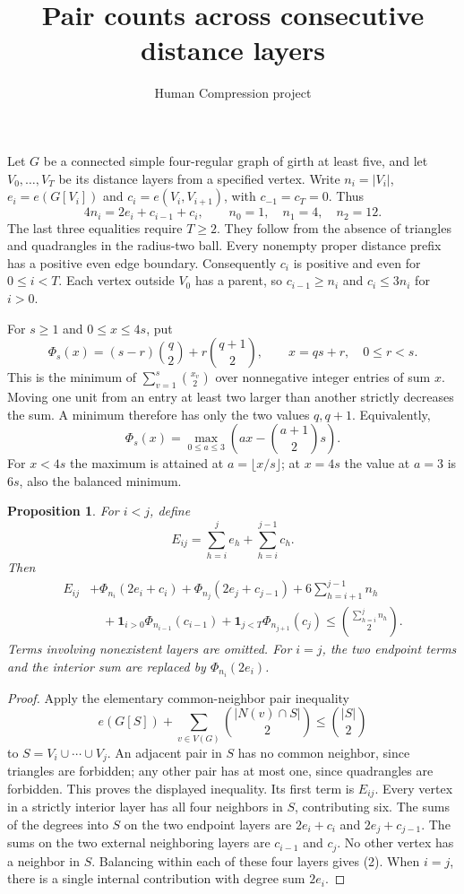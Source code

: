 \documentclass[11pt]{article}
\title{Pair counts across consecutive distance layers}
\author{Human Compression project}
\date{}
\newtheorem{proposition}{Proposition}
\begin{document}
\maketitle

Let $G$ be a connected simple four-regular graph of girth at least five,
and let $V_0,\ldots,V_T$ be its distance layers from a specified vertex.
Write $n_i=|V_i|$, $e_i=e(G[V_i])$ and $c_i=e(V_i,V_{i+1})$, with
$c_{-1}=c_T=0$. Thus
\[
 4n_i=2e_i+c_{i-1}+c_i,\qquad n_0=1,\quad n_1=4,\quad n_2=12.
\]
The last three equalities require $T\geq2$. They follow from the absence
of triangles and quadrangles in the radius-two ball. Every nonempty
proper distance prefix has a positive even edge boundary. Consequently
$c_i$ is positive and even for $0\leq i<T$. Each vertex outside $V_0$
has a parent, so $c_{i-1}\geq n_i$ and $c_i\leq3n_i$ for $i>0$.

For $s\geq1$ and $0\leq x\leq4s$, put
\[
 \Phi_s(x)=(s-r)\binom q2+r\binom{q+1}2,
 \qquad x=qs+r,\quad 0\leq r<s.
\]
This is the minimum of $\sum_{v=1}^s\binom{x_v}2$ over nonnegative
integer entries of sum $x$. Moving one unit from an entry at least two
larger than another strictly decreases the sum. A minimum therefore has
only the two values $q,q+1$. Equivalently,
\[
 \Phi_s(x)=\max_{0\leq a\leq3}\left(ax-\binom{a+1}2s\right).
 \tag{1}
\]
For $x<4s$ the maximum is attained at $a=\lfloor x/s\rfloor$;
at $x=4s$ the value at $a=3$ is $6s$, also the balanced minimum.

\begin{proposition}
For $i<j$, define
\[
 E_{ij}=\sum_{h=i}^j e_h+\sum_{h=i}^{j-1}c_h.
\]
Then
\begin{align*}
 E_{ij}&+\Phi_{n_i}(2e_i+c_i)
       +\Phi_{n_j}(2e_j+c_{j-1})+6\sum_{h=i+1}^{j-1}n_h\\
 &\quad+\mathbf1_{i>0}\Phi_{n_{i-1}}(c_{i-1})
       +\mathbf1_{j<T}\Phi_{n_{j+1}}(c_j)
 \leq \binom{\sum_{h=i}^j n_h}{2}.                         \tag{2}
\end{align*}
Terms involving nonexistent layers are omitted. For $i=j$, the two
endpoint terms and the interior sum are replaced by $\Phi_{n_i}(2e_i)$.
\end{proposition}
\begin{proof}
Apply the elementary common-neighbor pair inequality
\[
 e(G[S])+\sum_{v\in V(G)}\binom{|N(v)\cap S|}{2}\leq\binom{|S|}{2}
\]
to $S=V_i\cup\cdots\cup V_j$. An adjacent pair in $S$ has no common
neighbor, since triangles are forbidden; any other pair has at most one,
since quadrangles are forbidden. This proves the displayed inequality.
Its first term is $E_{ij}$. Every vertex in a strictly interior layer has
all four neighbors in $S$, contributing six. The sums of the degrees
into $S$ on the two endpoint layers are $2e_i+c_i$ and
$2e_j+c_{j-1}$. The sums on the two external neighboring layers are
$c_{i-1}$ and $c_j$. No other vertex has a neighbor in $S$.
Balancing within each of these four layers gives (2). When $i=j$,
there is a single internal contribution with degree sum $2e_i$.
\end{proof}
\end{document}
